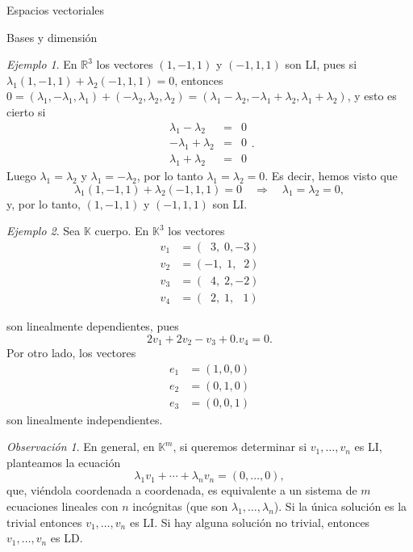 \documentclass[a4paper,12pt,twoside,spanish,reqno]{amsbook}
\numberwithin{equation}{section}
\theoremstyle{definition}
\theoremstyle{remark}
\newtheorem*{ejemplo*}{Ejemplo}
\newtheorem*{observacion*}{Observaci\'on}
\newcommand{\R}{\mathbb R}
\newcommand{\K}{\mathbb K}
\begin{document}
\begin{chapter}{Espacios vectoriales}
\begin{section}{Bases y dimensión}
\begin{ejemplo*}
    En $\R^3$  los vectores $(1,-1,1)$ y $(-1,1,1)$ son LI, pues si $\lambda_1(1,-1,1)+\lambda_2(-1,1,1) =0$,  entonces $0= (\lambda_1,-\lambda_1,\lambda_1)+(-\lambda_2,\lambda_2,\lambda_2) =  (\lambda_1-\lambda_2,-\lambda_1+\lambda_2,\lambda_1+\lambda_2)$, y esto es cierto si 
    \begin{equation*}
        \begin{array}{rcl}
        \lambda_1-\lambda_2 &=& 0 \\
        -\lambda_1+\lambda_2 &=& 0 \\
        \lambda_1+\lambda_2 &=& 0 
        \end{array}.
    \end{equation*} 
    Luego $\lambda_1 = \lambda_2$ y $\lambda_1 = -\lambda_2$, por lo tanto $\lambda_1 = \lambda_2 =0$. Es decir,  hemos visto que 
    $$
    \lambda_1(1,-1,1)+\lambda_2(-1,1,1) =0 \quad \Rightarrow \quad\lambda_1 = \lambda_2 =0,
    $$
    y, por lo tanto,  $(1,-1,1)$ y $(-1,1,1)$ son LI.
\end{ejemplo*}

\begin{ejemplo*} Sea $\K$  cuerpo. En $\K^3$ los vectores
    \begin{align*}
    v_1 &= (\;\;3,\;0,-3) \\
    v_2 &= (-1,\;1,\;\;2) \\
    v_3 &= (\;\;4,\;2,-2) \\
    v_4 &= (\;\;2,\;1,\,\;\;1)
    \end{align*}
    
    son linealmente dependientes, pues
    $$
    2v_1+2v_2 -v_3 +0.v_4 =0.
    $$
    Por otro lado, los vectores
    \begin{align*}
    e_1 &= (1,0,0) \\
    e_2 &= (0,1,0) \\
    e_3 &= (0,0,1) 
    \end{align*}
    son linealmente independientes.
\end{ejemplo*}


\begin{observacion*}
    En  general,  en $\K^m$, si queremos determinar si  $v_1,\ldots,v_n$ es LI, planteamos la ecuación  
    \begin{equation*}
    \lambda_1v_1+\cdots+\lambda_nv_n=(0,\ldots,0),
    \end{equation*}
    que, viéndola coordenada a coordenada, es equivalente a un sistema de $m$ ecuaciones lineales con  $n$ incógnitas (que son $\lambda_1,\ldots,\lambda_n$). Si  la única solución es la trivial entonces $v_1,\ldots,v_n$ es LI. Si hay alguna solución no trivial, entonces $v_1,\ldots,v_n$ es LD. 
\end{observacion*}
 

\end{section}
\end{chapter}
\end{document}
